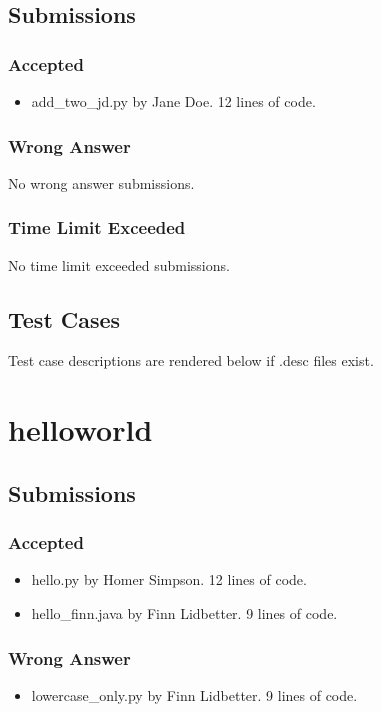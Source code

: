 \documentclass{article}%
\begin{document}
\subsection{Submissions}%
\label{subsec:Submissions}%
\subsubsection{Accepted}%
\label{ssubsec:Accepted}%
\begin{itemize}%
\item%
add\_two\_jd.py by Jane Doe. 12 lines of code.%
\end{itemize}

%
\subsubsection{Wrong Answer}%
\label{ssubsec:WrongAnswer}%
No wrong answer submissions.%

%
\subsubsection{Time Limit Exceeded}%
\label{ssubsec:TimeLimitExceeded}%
No time limit exceeded submissions.%

%
\subsection{Test Cases}%
\label{subsec:TestCases}%
Test case descriptions are rendered below if .desc files exist.%

%
\newpage%
\section{helloworld}%
\label{sec:helloworld}%
\subsection{Submissions}%
\label{subsec:Submissions}%
\subsubsection{Accepted}%
\label{ssubsec:Accepted}%
\begin{itemize}%
\item%
hello.py by Homer Simpson. 12 lines of code.%
\item%
hello\_finn.java by Finn Lidbetter. 9 lines of code.%
\end{itemize}

%
\subsubsection{Wrong Answer}%
\label{ssubsec:WrongAnswer}%
\begin{itemize}%
\item%
lowercase\_only.py by Finn Lidbetter. 9 lines of code.%
\end{itemize}
\end{document}
